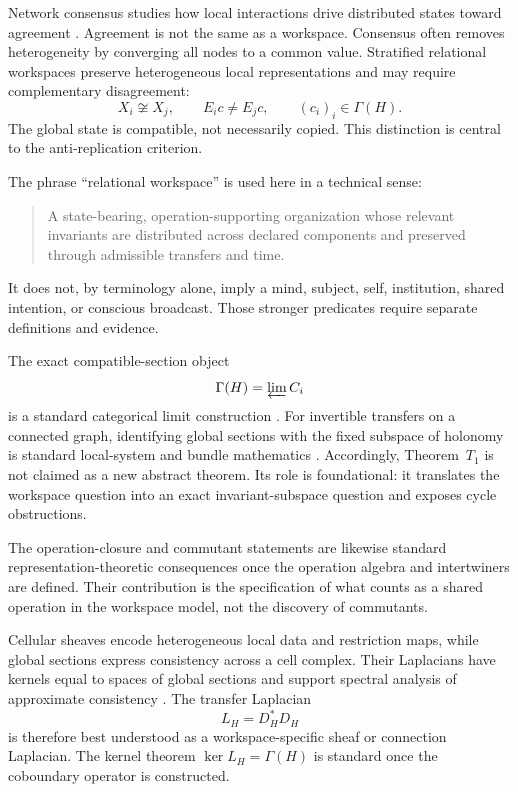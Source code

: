 
Network consensus studies how local interactions drive distributed states
toward agreement \cite{OlfatiSaberEtAl2007}. Agreement is not the same as a
workspace. Consensus often removes heterogeneity by converging all nodes to a
common value. Stratified relational workspaces preserve heterogeneous local
representations and may require complementary disagreement:
\[
X_i\not\cong X_j,
\qquad
E_i c\neq E_j c,
\qquad
(c_i)_i\in\Gamma(H).
\]
The global state is compatible, not necessarily copied. This distinction is
central to the anti-replication criterion.


The phrase ``relational workspace'' is used here in a technical sense:
\begin{quote}
A state-bearing, operation-supporting organization whose relevant invariants
are distributed across declared components and preserved through admissible
transfers and time.
\end{quote}
It does not, by terminology alone, imply a mind, subject, self, institution,
shared intention, or conscious broadcast. Those stronger predicates require
separate definitions and evidence.



The exact compatible-section object
\[
\Gamma(H)=\varprojlim C_i
\]
is a standard categorical limit construction \cite{MacLane1998}. For
invertible transfers on a connected graph, identifying global sections with
the fixed subspace of holonomy is standard local-system and bundle mathematics
\cite{Hatcher2002,Bredon1997}. Accordingly, Theorem~\(T_1\) is not claimed as
a new abstract theorem. Its role is foundational: it translates the workspace
question into an exact invariant-subspace question and exposes cycle
obstructions.

The operation-closure and commutant statements are likewise standard
representation-theoretic consequences once the operation algebra and
intertwiners are defined. Their contribution is the specification of what
counts as a shared operation in the workspace model, not the discovery of
commutants.


Cellular sheaves encode heterogeneous local data and restriction maps, while
global sections express consistency across a cell complex. Their Laplacians
have kernels equal to spaces of global sections and support spectral analysis
of approximate consistency \cite{HansenGhrist2019,Robinson2017}. The transfer
Laplacian
\[
L_H=D_H^*D_H
\]
is therefore best understood as a workspace-specific sheaf or connection
Laplacian. The kernel theorem \(\ker L_H=\Gamma(H)\) is standard once the
coboundary operator is constructed.

